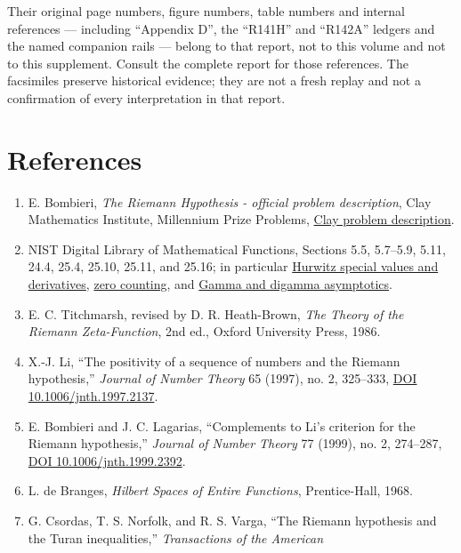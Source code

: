 \documentclass[
  11pt,
]{book}
\begin{document}
Their original page numbers, figure numbers, table numbers and internal
references --- including ``Appendix D'', the ``R141H'' and ``R142A''
ledgers and the named companion rails --- belong to that report, not to
this volume and not to this supplement. Consult the complete report for
those references. The facsimiles preserve historical evidence; they are
not a fresh replay and not a confirmation of every interpretation in
that report.

\newpage

\chapter{References}\label{references}

\begingroup
\small

\begin{enumerate}
\def\labelenumi{\arabic{enumi}.}
\item
  E. Bombieri, \emph{The Riemann Hypothesis - official problem
  description}, Clay Mathematics Institute, Millennium Prize Problems,
  \href{https://www.claymath.org/millennium/riemann-hypothesis/}{Clay
  problem description}.
\item
  NIST Digital Library of Mathematical Functions, Sections 5.5,
  5.7--5.9, 5.11, 24.4, 25.4, 25.10, 25.11, and 25.16; in particular
  \href{https://dlmf.nist.gov/25.11}{Hurwitz special values and
  derivatives}, \href{https://dlmf.nist.gov/25.10}{zero counting}, and
  \href{https://dlmf.nist.gov/5.11}{Gamma and digamma asymptotics}.
\item
  E. C. Titchmarsh, revised by D. R. Heath-Brown, \emph{The Theory of
  the Riemann Zeta-Function}, 2nd ed., Oxford University Press, 1986.
\item
  X.-J. Li, ``The positivity of a sequence of numbers and the Riemann
  hypothesis,'' \emph{Journal of Number Theory} 65 (1997), no. 2,
  325--333, \href{https://doi.org/10.1006/jnth.1997.2137}{DOI
  10.1006/jnth.1997.2137}.
\item
  E. Bombieri and J. C. Lagarias, ``Complements to Li's criterion for
  the Riemann hypothesis,'' \emph{Journal of Number Theory} 77 (1999),
  no. 2, 274--287, \href{https://doi.org/10.1006/jnth.1999.2392}{DOI
  10.1006/jnth.1999.2392}.
\item
  L. de Branges, \emph{Hilbert Spaces of Entire Functions},
  Prentice-Hall, 1968.
\item
  G. Csordas, T. S. Norfolk, and R. S. Varga, ``The Riemann hypothesis
  and the Turan inequalities,'' \emph{Transactions of the American
}
\end{enumerate}
\end{document}
